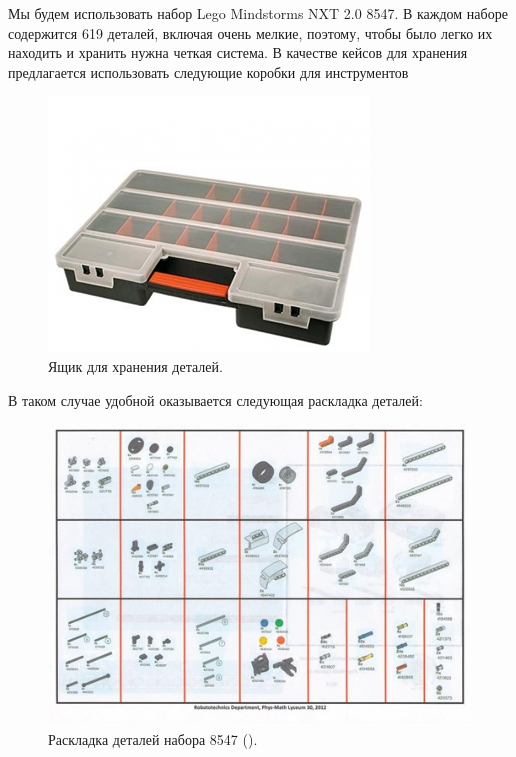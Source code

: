 {\hypertarget{lesson2x2}{}}\\\\

Мы будем использовать набор Lego Mindstorms NXT 2.0 8547. В каждом наборе содержится 619 деталей, включая очень мелкие, поэтому, чтобы было легко их находить и хранить нужна четкая система. В качестве кейсов для хранения предлагается использовать следующие коробки для инструментов
\begin{figure}[h!]
	\begin{center}
		\includegraphics[width=1\linewidth]{chapters/chapter2/images/1}
		\caption{Ящик для хранения деталей.}
		\label{ris:image2x1}
	\end{center}
\end{figure}			

В таком случае удобной оказывается следующая раскладка деталей:
\begin{figure}[h!]
	\begin{center}
		\includegraphics[width=1\linewidth]{chapters/chapter2/images/2}
		\caption{Раскладка деталей набора 8547 ().}
		\label{ris:image2x2}
	\end{center}
\end{figure}		

